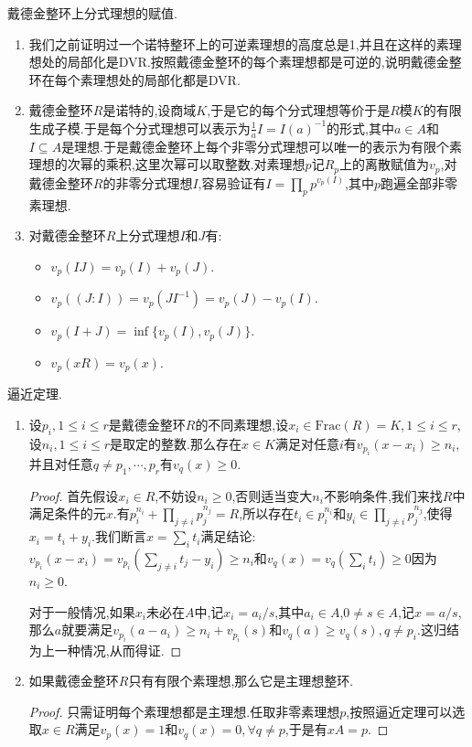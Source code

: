 戴德金整环上分式理想的赋值.
\begin{enumerate}
	\item 我们之前证明过一个诺特整环上的可逆素理想的高度总是1,并且在这样的素理想处的局部化是DVR.按照戴德金整环的每个素理想都是可逆的,说明戴德金整环在每个素理想处的局部化都是DVR.
	\item 戴德金整环$R$是诺特的,设商域$K$,于是它的每个分式理想等价于是$R$模$K$的有限生成子模.于是每个分式理想可以表示为$\frac{1}{a}I=I(a)^{-1}$的形式,其中$a\in A$和$I\subseteq A$是理想.于是戴德金整环上每个非零分式理想可以唯一的表示为有限个素理想的次幂的乘积,这里次幂可以取整数.对素理想$p$记$R_p$上的离散赋值为$v_p$,对戴德金整环$R$的非零分式理想$I$,容易验证有$I=\prod_pp^{v_p(I)}$,其中$p$跑遍全部非零素理想.
	\item 对戴德金整环$R$上分式理想$I$和$J$有:
	\begin{itemize}
		\item $v_p(IJ)=v_p(I)+v_p(J)$.
		\item $v_p((J:I))=v_p(JI^{-1})=v_p(J)-v_p(I)$.
		\item $v_p(I+J)=\inf\{v_p(I),v_p(J)\}$.
		\item $v_p(xR)=v_p(x)$.
	\end{itemize}
\end{enumerate}

逼近定理.
\begin{enumerate}
	\item 设$p_i,1\le i\le r$是戴德金整环$R$的不同素理想,设$x_i\in\mathrm{Frac}(R)=K,1\le i\le r$,设$n_i,1\le i\le r$是取定的整数.那么存在$x\in K$满足对任意$i$有$v_{p_i}(x-x_i)\ge n_i$,并且对任意$q\not=p_1,\cdots,p_r$有$v_q(x)\ge0$.
	\begin{proof}
		
		首先假设$x_i\in R$,不妨设$n_i\ge0$,否则适当变大$n_i$不影响条件,我们来找$R$中满足条件的元$x$.有$p_i^{n_i}+\prod_{j\not=i}p_j^{n_j}=R$,所以存在$t_i\in p_i^{n_i}$和$y_i\in\prod_{j\not=i}p_j^{n_j}$,使得$x_i=t_i+y_i$.我们断言$x=\sum_it_i$满足结论:$v_{p_i}(x-x_i)=v_{p_i}(\sum_{j\not=i}t_j-y_i)\ge n_i$和$v_q(x)=v_q(\sum_it_i)\ge0$因为$n_i\ge0$.
		
		对于一般情况,如果$x_i$未必在$A$中,记$x_i=a_i/s$,其中$a_i\in A$,$0\not=s\in A$,记$x=a/s$,那么$a$就要满足$v_{p_i}(a-a_i)\ge n_i+v_{p_i}(s)$和$v_q(a)\ge v_q(s),q\not=p_i$.这归结为上一种情况,从而得证.
	\end{proof}
    \item 如果戴德金整环$R$只有有限个素理想,那么它是主理想整环.
    \begin{proof}
    	
    	只需证明每个素理想都是主理想.任取非零素理想$p$,按照逼近定理可以选取$x\in R$满足$v_p(x)=1$和$v_q(x)=0,\forall q\not=p$,于是有$xA=p$.
    \end{proof}
\end{enumerate} 

